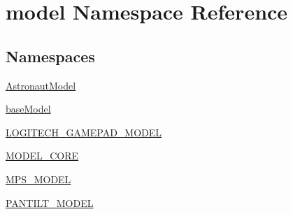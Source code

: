 \hypertarget{namespacemodel}{}\section{model Namespace Reference}
\label{namespacemodel}
\subsection*{Namespaces}
\begin{DoxyCompactItemize}
\item 
 \hyperlink{namespacemodel_1_1AstronautModel}{Astronaut\+Model}
\item 
 \hyperlink{namespacemodel_1_1baseModel}{base\+Model}
\item 
 \hyperlink{namespacemodel_1_1LOGITECH__GAMEPAD__MODEL}{L\+O\+G\+I\+T\+E\+C\+H\+\_\+\+G\+A\+M\+E\+P\+A\+D\+\_\+\+M\+O\+D\+E\+L}
\item 
 \hyperlink{namespacemodel_1_1MODEL__CORE}{M\+O\+D\+E\+L\+\_\+\+C\+O\+R\+E}
\item 
 \hyperlink{namespacemodel_1_1MPS__MODEL}{M\+P\+S\+\_\+\+M\+O\+D\+E\+L}
\item 
 \hyperlink{namespacemodel_1_1PANTILT__MODEL}{P\+A\+N\+T\+I\+L\+T\+\_\+\+M\+O\+D\+E\+L}
\end{DoxyCompactItemize}
